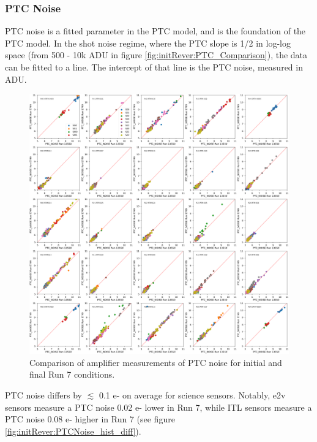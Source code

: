 \subsubsection{PTC Noise}\label{sec:initialRever:PTCNoise}

PTC noise is a fitted parameter in the PTC model, and is the foundation of the PTC model. In the shot noise regime, where the PTC slope is 1/2 in log-log space (from 500 - 10k ADU in figure \ref{fig:initRever:PTC_Comparison}), the data can be fitted to a line. The intercept of that line is the PTC noise, measured in ADU.

\begin{figure}[ht]
    \centering
    \includegraphics[width=0.7\linewidth]{figures/baselineCharacterization/13550_E749_PTC_NOISE.png}
    \caption{Comparison of amplifier measurements of PTC noise for initial and final Run 7 conditions.}
    \label{fig:initRever-PTC_NOISE_5x5}
\end{figure}

PTC noise differs by $\lesssim$ 0.1 e- on average for science sensors. Notably, e2v sensors measure a PTC noise 0.02 e- lower in Run 7, while ITL sensors measure a PTC noise 0.08 e- higher in Run 7 (see figure \ref{fig:initRever:PTCNoise_hist_diff}).

